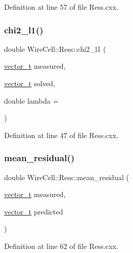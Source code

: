 Definition at line 57 of file Ress.\+cxx.

\mbox{\label{namespace_wire_cell_1_1_ress_a0f6f8764e96a080b10c03f7432fe9bba}} 
\subsubsection{\texorpdfstring{chi2\+\_\+l1()}{chi2\_l1()}}
{\footnotesize\ttfamily double Wire\+Cell\+::\+Ress\+::chi2\+\_\+l1 (\begin{DoxyParamCaption}\item[{\hyperlink{namespace_wire_cell_1_1_ress_a4f1e55ff97c04ad9ff5530f3f5e8c453}{vector\+\_\+t}}]{measured,  }\item[{\hyperlink{namespace_wire_cell_1_1_ress_a4f1e55ff97c04ad9ff5530f3f5e8c453}{vector\+\_\+t}}]{solved,  }\item[{double}]{lambda = {} }\end{DoxyParamCaption})}



Definition at line 47 of file Ress.\+cxx.

\mbox{\label{namespace_wire_cell_1_1_ress_a649d5fb1892afac9f20fde57b9c93382}} 
\subsubsection{\texorpdfstring{mean\+\_\+residual()}{mean\_residual()}}
{\footnotesize\ttfamily double Wire\+Cell\+::\+Ress\+::mean\+\_\+residual (\begin{DoxyParamCaption}\item[{\hyperlink{namespace_wire_cell_1_1_ress_a4f1e55ff97c04ad9ff5530f3f5e8c453}{vector\+\_\+t}}]{measured,  }\item[{\hyperlink{namespace_wire_cell_1_1_ress_a4f1e55ff97c04ad9ff5530f3f5e8c453}{vector\+\_\+t}}]{predicted }\end{DoxyParamCaption})}



Definition at line 62 of file Ress.\+cxx.

